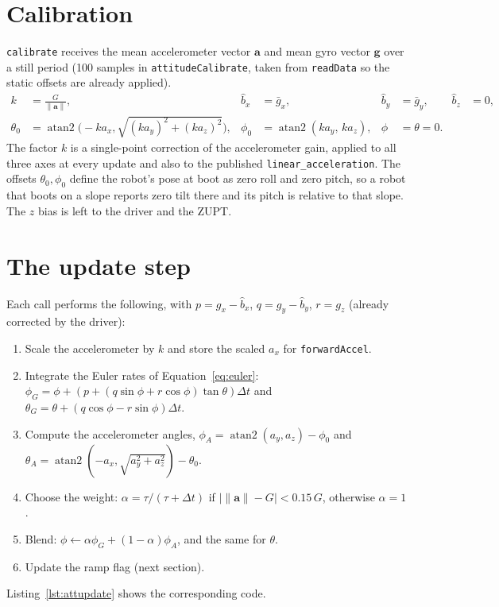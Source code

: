 \documentclass[11pt,a4paper]{report}
\newcommand{\code}[1]{\texttt{#1}}
\begin{document}
\section{Calibration}
\code{calibrate} receives the mean accelerometer vector $\mathbf a$ and mean gyro vector $\mathbf g$ over a still period (100 samples in \code{attitudeCalibrate}, taken from \code{readData} so the static offsets are already applied).
\begin{align}
  k&=\frac{G}{\lVert\mathbf a\rVert}, & \hat b_x&=\bar g_x, & \hat b_y&=\bar g_y, & \hat b_z&=0, \label{eq:attcal}\\
  \theta_0&=\operatorname{atan2}\bigl(-ka_x,\sqrt{(ka_y)^2+(ka_z)^2}\bigr), & \phi_0&=\operatorname{atan2}(ka_y,\,ka_z), & \phi&=\theta=0.
\end{align}
The factor $k$ is a single-point correction of the accelerometer gain, applied to all three axes at every update and also to the published \code{linear\_acceleration}. The offsets $\theta_0,\phi_0$ define the robot's pose at boot as zero roll and zero pitch, so a robot that boots on a slope reports zero tilt there and its pitch is relative to that slope. The $z$ bias is left to the driver and the ZUPT.

\section{The update step}\label{sec:attupdate}
Each call performs the following, with $p=g_x-\hat b_x$, $q=g_y-\hat b_y$, $r=g_z$ (already corrected by the driver):
\begin{enumerate}[noitemsep]
  \item Scale the accelerometer by $k$ and store the scaled $a_x$ for \code{forwardAccel}.
  \item Integrate the Euler rates of Equation~\eqref{eq:euler}: $\phi_G=\phi+(p+(q\sin\phi+r\cos\phi)\tan\theta)\Delta t$ and $\theta_G=\theta+(q\cos\phi-r\sin\phi)\Delta t$.
  \item Compute the accelerometer angles, $\phi_A=\operatorname{atan2}(a_y,a_z)-\phi_0$ and $\theta_A=\operatorname{atan2}(-a_x,\sqrt{a_y^2+a_z^2})-\theta_0$.
  \item Choose the weight: $\alpha=\tau/(\tau+\Delta t)$ if $|\lVert\mathbf a\rVert-G|<0.15\,G$, otherwise $\alpha=1$.
  \item Blend: $\phi\leftarrow\alpha\phi_G+(1-\alpha)\phi_A$, and the same for $\theta$.
  \item Update the ramp flag (next section).
\end{enumerate}
Listing~\ref{lst:attupdate} shows the corresponding code.
\end{document}
